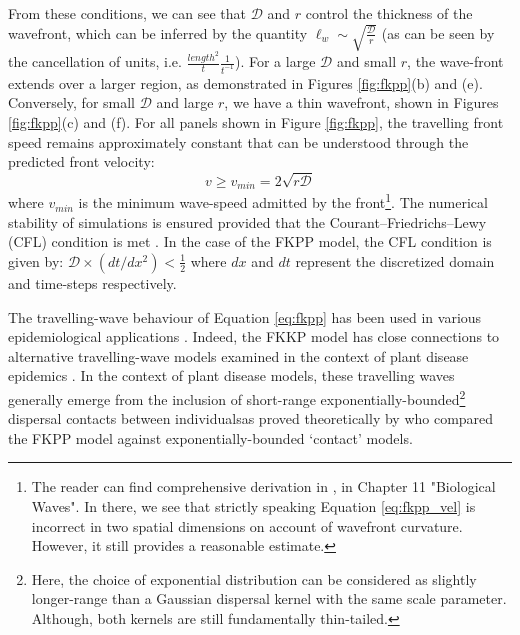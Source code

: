 From these conditions, we can see that $\mathcal{D}$ and $r$ control the thickness of the wavefront,
which can be inferred by the quantity  $\ell_{w} \sim \sqrt{ \frac{\mathcal{D}}{r}}$ 
(as can be seen by the cancellation of units, i.e. $\frac{length^2}{t} \frac{1}{t^{-1}}$).
For a large $\mathcal{D}$ and small $r$, the wave-front extends over a larger region, as 
demonstrated in Figures \ref{fig:fkpp}(b) and (e). Conversely, for
small $\mathcal{D}$ and large $r$, we have a thin wavefront, shown in Figures \ref{fig:fkpp}(c) and (f).
For all panels shown in Figure \ref{fig:fkpp}, the travelling front speed remains
approximately constant that can be understood through the predicted front velocity:
\begin{equation}
    \label{eq:fkpp_vel}
    v \geq v_{min} = 2\sqrt{r\mathcal{D}}
\end{equation}
where $v_{min}$ is the minimum wave-speed admitted by the front\footnote{
The reader can find comprehensive derivation in \cite{murray2002mathematicalbiology}, 
in Chapter 11 "Biological Waves". In there, we see that strictly speaking Equation \ref{eq:fkpp_vel} 
is incorrect in two spatial dimensions on account of wavefront curvature. However, it still provides
a reasonable estimate.}.
The numerical stability of simulations is ensured provided that the Courant–Friedrichs–Lewy (CFL) condition
is met \cite{cfl-condition}.
In the case of the FKPP model, the CFL condition is given by: $\mathcal{D} \times (dt/dx^2 )< \frac{1}{2}$
where $dx$ and $dt$ represent the discretized domain and time-steps respectively.

The travelling-wave behaviour of Equation \ref{eq:fkpp} has been used in various epidemiological applications
\cite{britton1986reaction, murray2002mathematicalbiology, klein2010reaction,bianco2013reaction, yano2017kinetic}.
Indeed, the FKKP model has close connections to alternative travelling-wave models examined in the context of
plant disease epidemics \cite{heesterbeek1987modelling, van1988focus}. In the context of plant disease models, 
these travelling waves generally emerge from the inclusion of short-range exponentially-bounded\footnote{
Here, the choice of exponential distribution can be considered as slightly longer-range than a Gaussian dispersal kernel 
with the same scale parameter. Although, both kernels are still fundamentally thin-tailed.} dispersal contacts
between individuals\textemdash as proved theoretically by \cite{mollison1977spatial} who compared the FKPP model against 
exponentially-bounded `contact' models.

